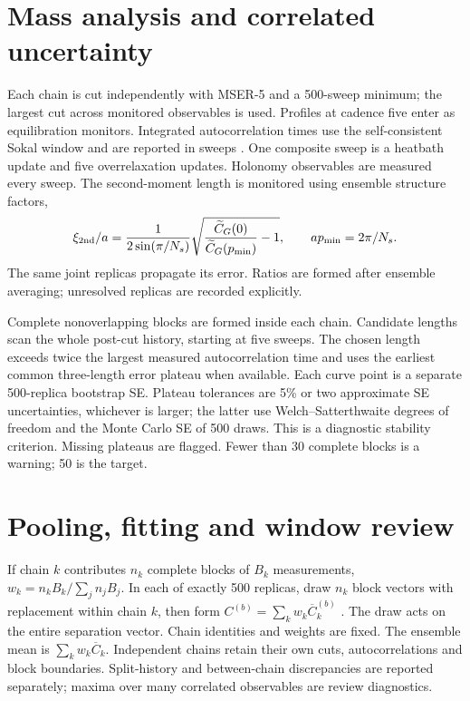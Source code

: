 \documentclass[11pt,a4paper]{article}
\begin{document}
\section*{Mass analysis and correlated uncertainty}
Each chain is cut independently with MSER-5 and a 500-sweep minimum;
the largest cut across monitored observables is used. Profiles at cadence
five enter as equilibration monitors. Integrated autocorrelation times use
the self-consistent Sokal window and are reported in sweeps \cite{sokal}.
One composite sweep is a heatbath update and five overrelaxation updates.
Holonomy observables are measured every sweep.
The second-moment length is monitored using ensemble structure factors,
\[
 \xi_{\rm 2nd}/a=\frac{1}{2\sin(\pi/N_s)}
 \sqrt{\frac{\widetilde C_G(0)}{\widetilde C_G(p_{\min})}-1},
 \qquad ap_{\min}=2\pi/N_s.
\]
The same joint replicas propagate its error. Ratios are formed after
ensemble averaging; unresolved replicas are recorded explicitly.

Complete nonoverlapping blocks are formed inside each chain. Candidate
lengths scan the whole post-cut history, starting at five sweeps. The chosen
length exceeds twice the largest measured autocorrelation time and uses
the earliest common three-length error plateau when available. Each curve
point is a separate 500-replica bootstrap SE. Plateau tolerances are 5\%
or two approximate SE uncertainties, whichever is larger; the latter use
Welch--Satterthwaite degrees of freedom and the Monte Carlo SE of 500 draws.
This is a diagnostic stability criterion. Missing plateaus are flagged.
Fewer than 30 complete blocks is a warning; 50 is the target.

\clearpage\section*{Pooling, fitting and window review}
If chain $k$ contributes $n_k$ complete blocks of $B_k$ measurements,
$w_k=n_kB_k/\sum_j n_jB_j$. In each of exactly 500 replicas, draw $n_k$
block vectors with replacement within chain $k$, then form
$C^{(b)}=\sum_k w_k\overline C_k^{(b)}$ \cite{efron}.
The draw acts on the entire separation vector. Chain identities and weights
are fixed. The ensemble mean is $\sum_k w_k\overline C_k$.
Independent chains retain their own cuts, autocorrelations and block
boundaries. Split-history and between-chain discrepancies are reported
separately; maxima over many correlated observables are review diagnostics.
\end{document}
